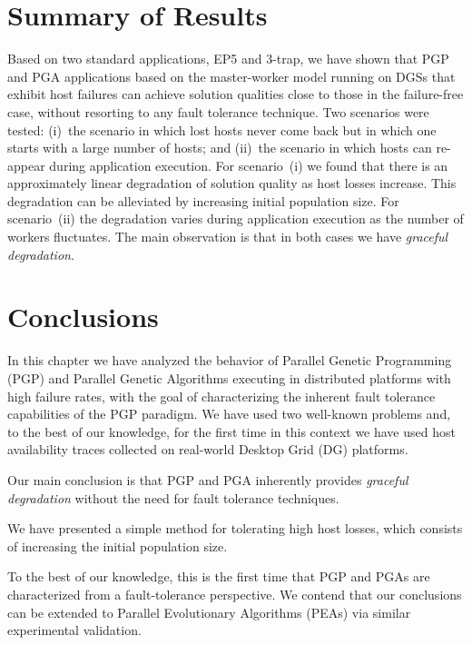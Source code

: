 \documentclass[graybox]{sty/svmult}
\begin{document}
\section{Summary of Results}

Based on two standard applications, EP5 and 3-trap,  we have shown that
PGP and PGA applications based on the master-worker model running on DGSs
that exhibit host failures can achieve solution qualities close to
those in the failure-free case, without resorting to any fault
tolerance technique.  Two scenarios were tested: (i)~the scenario in
which lost hosts never come back but in which one starts with a large
number of hosts; and (ii)~the scenario in which hosts can re-appear
during application execution.  For scenario~(i) we found that there is
an approximately linear degradation of solution quality as host losses
increase. This degradation can be alleviated by increasing initial
population size.  For scenario~(ii) the degradation varies during
application execution as the number of workers fluctuates.  The main observation
is that in both cases we have \emph{graceful degradation}.

\section{Conclusions} 
\label{conclusions}
In this chapter we have analyzed the behavior of Parallel Genetic
Programming (PGP) and Parallel Genetic Algorithms executing in distributed platforms with
high failure rates, with the goal of characterizing the inherent fault
tolerance capabilities of the PGP paradigm.  We have used two well-known
problems and, to the best of our knowledge, for the first time in this
context we have used host availability traces collected on real-world
Desktop Grid (DG) platforms.

Our main conclusion is that PGP and PGA inherently provides \emph{graceful
degradation} without the need for fault tolerance techniques.

We have presented a simple method for tolerating high host losses,
which consists of increasing the initial population size. 

To the best of our knowledge, this is the first time that PGP and PGAs are
characterized from a fault-tolerance perspective.  We contend that our
conclusions can be extended to Parallel Evolutionary Algorithms (PEAs)
via similar experimental validation. 


\end{document}
